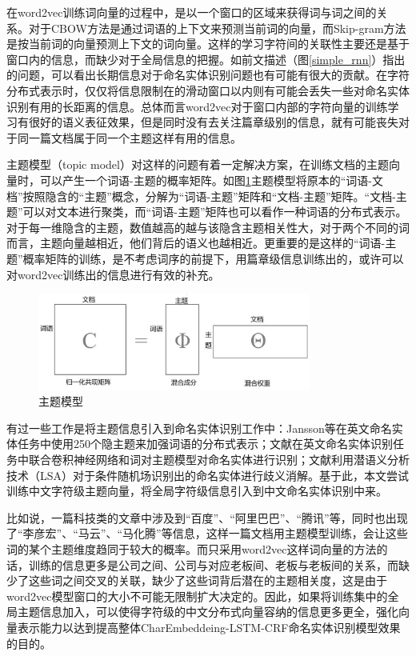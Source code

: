 \documentclass[winfonts,master,oneside,nobackinfo]{njuthesis}
\begin{document}
在word2vec训练词向量的过程中，是以一个窗口的区域来获得词与词之间的关系。对于CBOW方法是通过词语的上下文来预测当前词的向量，而Skip-gram方法是按当前词的向量预测上下文的词向量。这样的学习字符间的关联性主要还是基于窗口内的信息，而缺少对于全局信息的把握。如前文描述（图\ref{simple_rnn}）指出的问题，可以看出长期信息对于命名实体识别问题也有可能有很大的贡献。在字符分布式表示时，仅仅将信息限制在的滑动窗口以内则有可能会丢失一些对命名实体识别有用的长距离的信息。总体而言word2vec对于窗口内部的字符向量的训练学习有很好的语义表征效果，但是同时没有去关注篇章级别的信息，就有可能丧失对于同一篇文档属于同一个主题这样有用的信息。

主题模型（topic model）对这样的问题有着一定解决方案，在训练文档的主题向量时，可以产生一个词语-主题的概率矩阵。如图\ref{lda-vec}主题模型将原本的“词语-文档”按照隐含的“主题”概念，分解为“词语-主题”矩阵和“文档-主题”矩阵。“文档-主题”可以对文本进行聚类，而“词语-主题”矩阵也可以看作一种词语的分布式表示。对于每一维隐含的主题，数值越高的越与该隐含主题相关性大，对于两个不同的词而言，主题向量越相近，他们背后的语义也越相近。更重要的是这样的“词语-主题”概率矩阵的训练，是不考虑词序的前提下，用篇章级信息训练出的，或许可以对word2vec训练出的信息进行有效的补充。

\begin{figure}[H]
\centering
\includegraphics[width=0.8\textwidth]{./figure/主题模型.jpg}
\caption{主题模型}
\label{lda-vec}
\end{figure}
有过一些工作是将主题信息引入到命名实体识别工作中：Jansson等\cite{Jansson}在英文命名实体任务中使用250个隐主题来加强词语的分布式表示；文献\cite{kang}在英文命名实体识别任务中联合卷积神经网络和词对主题模型对命名实体进行识别；文献\cite{gong}利用潜语义分析技术（LSA）对于条件随机场识别出的命名实体进行歧义消解。基于此，本文尝试训练中文字符级主题向量，将全局字符级信息引入到中文命名实体识别中来。

比如说，一篇科技类的文章中涉及到“百度”、“阿里巴巴”、“腾讯”等，同时也出现了“李彦宏”、“马云”、“马化腾”等信息，这样一篇文档用主题模型训练，会让这些词的某个主题维度趋同于较大的概率。而只采用word2vec这样词向量的方法的话，训练的信息更多是公司之间、公司与对应老板间、老板与老板间的关系，而缺少了这些词之间交叉的关联，缺少了这些词背后潜在的主题相关度，这是由于word2vec模型窗口的大小不可能无限制扩大决定的。因此，如果将训练集中的全局主题信息加入，可以使得字符级的中文分布式向量容纳的信息更多更全，强化向量表示能力以达到提高整体CharEmbeddeing-LSTM-CRF命名实体识别模型效果的目的。
\end{document}
